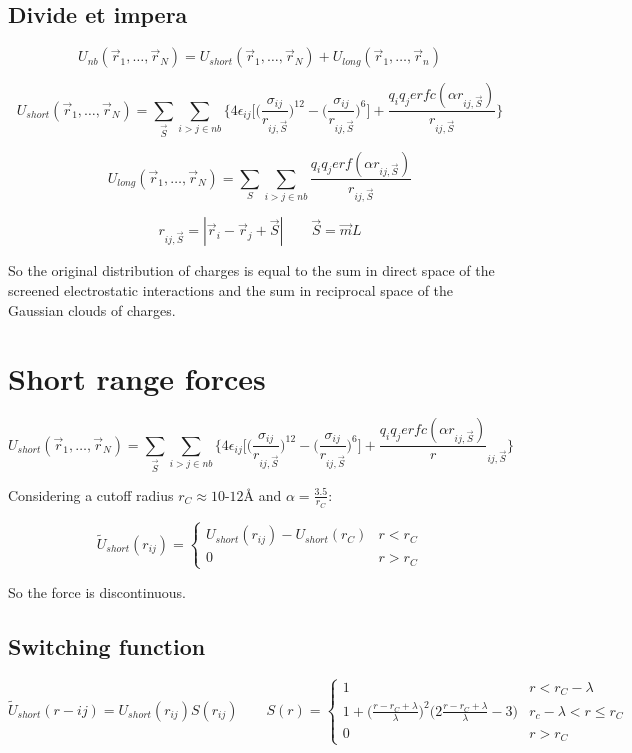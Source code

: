	\subsection{Divide et impera}

	$$U_{nb}(\vec{r}_1, \dots, \vec{r}_N) = U_{short}(\vec{r}_1, \dots, \vec{r}_N) + U_{long}(\vec{r}_1, \dots, \vec{r}_n)$$

	$$U_{short}(\vec{r}_1, \dots, \vec{r}_N) = \sum\limits_{\vec{S}}\sum\limits_{i>j\in nb}\biggl\{4\epsilon_{ij}\biggl[\biggl(\frac{\sigma_{ij}}{r_{ij,\vec{S}}}\biggr)^{12}-\biggl(\frac{\sigma_{ij}}{r_{ij, \vec{S}}}\biggr)^6\biggr] + \frac{q_iq_jerfc(\alpha r_{ij, \vec{S}})}{r_{ij, \vec{S}}}\biggr\}$$

	$$U_{long}(\vec{r}_1, \dots, \vec{r}_N) = \sum\limits_S\sum\limits_{i>j\in nb} \frac{q_iq_j erf(\alpha r_{ij, \vec{S}})}{r_{ij, \vec{S}}}$$

	$$r_{ij, \vec{S}} = |\vec{r}_i-\vec{r}_j + \vec{S}|\qquad \vec{S} = \vec{m}L$$

	So the original distribution of charges is equal to the sum in direct space of the screened electrostatic interactions and the sum in reciprocal space of the Gaussian clouds of charges.

\section{Short range forces}

$$U_{short}(\vec{r}_1, \dots, \vec{r}_N) = \sum\limits_{\vec{S}}\sum\limits_{i>j\in nb}\biggl\{4\epsilon_{ij}\biggl[\biggl(\frac{\sigma_{ij}}{r_{ij, \vec{S}}}\biggr)^{12} - \biggl(\frac{\sigma_{ij}}{r_{ij, \vec{S}}}\biggr)^{6}\biggr] + \frac{q_iq_jerfc(\alpha r_{ij, \vec{S}})}r_{ij, \vec{S}}\biggr\}$$

Considering a cutoff radius $r_C\approx 10$-$12\si{\angstrom}$ and $\alpha = \frac{3.5}{r_C}$:

$$\tilde{U}_{short}(r_{ij}) = \begin{cases} U_{short}(r_{ij}) - U_{short}(r_C) & r<r_C\\ 0 & r>r_C\end{cases}$$

So the force is discontinuous.

	\subsection{Switching function}

	$$\tilde{U}_{short}(r-{ij}) = U_{short}(r_{ij})S(r_{ij})\qquad S(r) = \begin{cases} 1 & r<r_C-\lambda\\ 1 + \biggl(\frac{r-r_C+\lambda}{\lambda}\biggr)^2\biggl(2\frac{r-r_C + \lambda}{\lambda} - 3\biggr) & r_c -\lambda < r\le r_C\\0 & r> r_C\end{cases}$$


